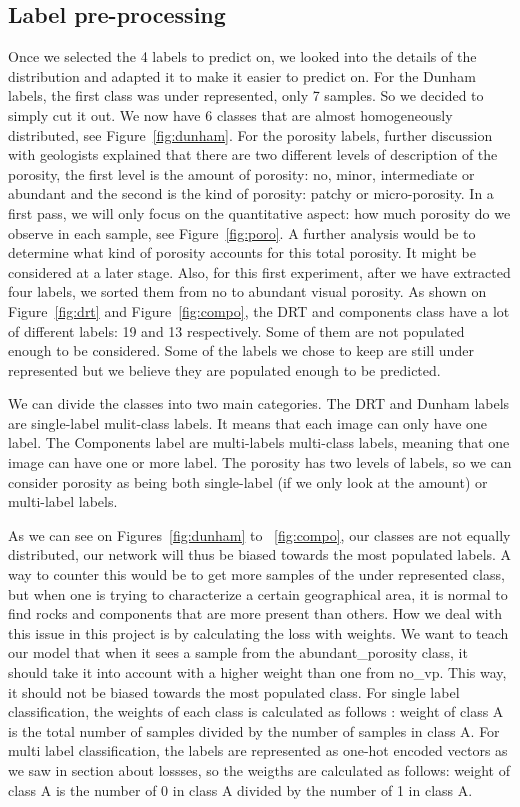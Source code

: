 \subsection{Label pre-processing}
Once we selected the 4 labels to predict on, we looked into the details of the distribution and adapted it to make it easier to predict on. For the Dunham labels, the first class was under represented, only 7 samples. So we decided to simply cut it out. We now have 6 classes that are almost homogeneously distributed, see Figure~\ref{fig:dunham}. 
For the porosity labels, further discussion with geologists explained that there are two different levels of description of the porosity, the first level is the amount of porosity: no, minor, intermediate or abundant and the second is the kind of porosity: patchy or micro-porosity. In a first pass, we will only focus on the quantitative aspect: how much porosity do we observe in each sample, see Figure~\ref{fig:poro}. A further analysis would be to determine what kind of porosity accounts for this total porosity. It might be considered at a later stage. Also, for this first experiment, after we have extracted four labels, we sorted them from no to abundant visual porosity. 
As shown on Figure~\ref{fig:drt} and Figure~\ref{fig:compo}, the DRT and components class have a lot of different labels: 19 and 13 respectively. Some of them are not populated enough to be considered. Some of the labels we chose to keep are still under represented but we believe they are populated enough to be predicted.

We can divide the classes into two main categories. The DRT and Dunham labels are single-label mulit-class labels. It means that each image can only have one label. The Components label are multi-labels multi-class labels, meaning that one image can have one or more label. The porosity has two levels of labels, so we can consider porosity as being both single-label (if we only look at the amount) or multi-label labels. 


As we can see on Figures~\ref{fig:dunham} to ~\ref{fig:compo}, our classes are not equally distributed, our network will thus be biased towards the most populated labels. A way to counter this would be to get more samples of the under represented class, but when one is trying to characterize a certain geographical area, it is normal to find rocks and components that are more present than others. How we deal with this issue in this project is by calculating the loss with weights. We want to teach our model that when it sees a sample from the abundant\_porosity class, it should take it into account with a higher weight than one from no\_vp. This way, it should not be biased towards the most populated class. 
For single label classification, the weights of each class is calculated as follows : weight of class A is the total number of samples divided by the number of samples in class A.
For multi label classification, the labels are represented as one-hot encoded vectors as we saw in section about lossses, so the weigths are calculated as follows: weight of class A is the number of 0 in class A divided by the number of 1 in class A.

